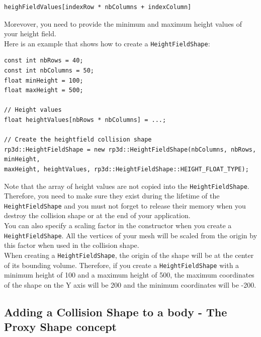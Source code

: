 \documentclass[a4paper,12pt]{article}
\begin{document}
  \begin{lstlisting}
heighFieldValues[indexRow * nbColumns + indexColumn]
  \end{lstlisting}

  \vspace{0.6cm}

  Morevover, you need to provide the minimum and maximum height values of your height field. \\

  Here is an example that shows how to create a \texttt{HeightFieldShape}: \\

  \begin{lstlisting}
const int nbRows = 40;
const int nbColumns = 50;
float minHeight = 100;
float maxHeight = 500;

// Height values
float heightValues[nbRows * nbColumns] = ...;

// Create the heightfield collision shape
rp3d::HeightFieldShape = new rp3d::HeightFieldShape(nbColumns, nbRows, minHeight,
maxHeight, heightValues, rp3d::HeightFieldShape::HEIGHT_FLOAT_TYPE);
  \end{lstlisting}

  \vspace{0.6cm}

  Note that the array of height values are not copied into the \texttt{HeightFieldShape}. Therefore, you need to make sure
  they exist during the lifetime of the \texttt{HeightField\allowbreak Shape} and you must not forget to release their memory when you
  destroy the collision shape or at the end of your application. \\

  You can also specify a scaling factor in the constructor when you create a \texttt{Height\allowbreak FieldShape}. All the vertices of your mesh will be scaled from the origin by this factor
  when used in the collision shape. \\

  When creating a \texttt{HeightFieldShape}, the origin of the shape will be at the center of its bounding volume.
  Therefore, if you create a \texttt{HeightFieldShape} with a minimum height of 100 and a maximum height of 500, the
  maximum coordinates of the shape on the Y axis will be 200 and the minimum coordinates will be -200.

    \subsection{Adding a Collision Shape to a body - The Proxy Shape concept}
\end{document}
